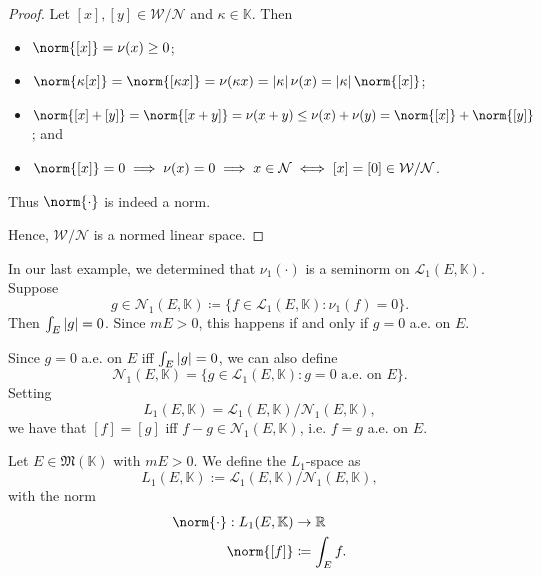 \documentclass[notoc,notitlepage]{tufte-book}
\begin{document}
\begin{proof}
  \noindent
   Let $[x], [y] \in \mathcal{W} /
  \mathcal{N}$ and $\kappa \in \mathbb{K}$. Then
  \begin{itemize}
    \item $\norm{[x]} = \nu(x) \geq 0$; 
    \item $\norm{\kappa[x]} = \norm{[\kappa x]} = \nu(\kappa x) = \abs{\kappa}
      \nu(x) = \abs{\kappa} \norm{[x]}$;
    \item $\norm{[x] + [y]} = \norm{[x + y]} = \nu(x + y) \leq \nu(x) + \nu(y) =
      \norm{[x]} + \norm{[y]}$; and
    \item $\norm{[x]} = 0 \implies \nu(x) = 0 \implies x \in \mathcal{N} \iff
      [x] = [0] \in \mathcal{W} / \mathcal{N}$.
  \end{itemize}
  Thus $\norm{\cdot}$ is indeed a norm.

  Hence, $\mathcal{W} / \mathcal{N}$ is a normed linear space.
\end{proof}

\begin{eg}
  In our last example, we determined that $\nu_1(\cdot)$ is a seminorm on
  $\mathcal{L}_1(E, \mathbb{K})$. Suppose
  \begin{equation*}
    g \in \mathcal{N}_1(E, \mathbb{K}) \coloneqq \{ f \in \mathcal{L}_1(E,
    \mathbb{K}) : \nu_1(f) = 0 \}.
  \end{equation*}
  Then $\int_{E} \left|g\right| = 0$. Since $mE > 0$, this happens if and only if $g =
  0$ a.e. on $E$.

  Since $g = 0$ a.e. on $E$ iff $\int_{E} \left|g\right| = 0$, we can also define
  \begin{equation*}
    \mathcal{N}_1(E, \mathbb{K}) = \{ g \in \mathcal{L}_1(E, \mathbb{K}) : g = 0
    \text{ a.e. on } E \}.
  \end{equation*}
  Setting
  \begin{equation*}
    L_1(E, \mathbb{K}) = \mathcal{L}_1(E, \mathbb{K}) / \mathcal{N}_1(E,
    \mathbb{K}),
  \end{equation*}
  we have that $[f] = [g]$ iff $f - g \in \mathcal{N}_1(E, \mathbb{K})$, i.e. $f
  = g$ a.e. on $E$.
\end{eg}

\begin{defn}[$L_1$-space]\label{defn:_l_1_space}
  Let $E \in \mathfrak{M}(\mathbb{K})$ with $mE > 0$. We define the $L_1$-space
  as
  \begin{equation*}
    L_1(E, \mathbb{K}) := \mathcal{L}_1(E, \mathbb{K}) / \mathcal{N}_1(E,
    \mathbb{K}),
  \end{equation*}
  with the norm
  \begin{align*}
    \norm{\cdot} : L_1(E, \mathbb{K}) &\to \mathbb{R} \\
    \norm{[f]} &\coloneqq \int_{E} f. 
  \end{align*}
\end{defn}
\end{document}
